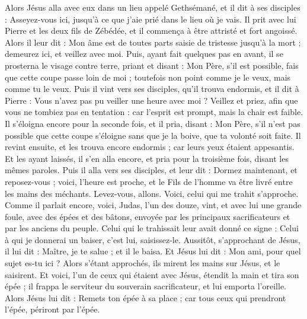 \begin{multicols}{2}
Alors Jésus alla avec eux dans un lieu appelé Gethsémané, et il dit à ses disciples : Asseyez-vous ici, jusqu'à ce que j’aie prié dans le lieu où je vais.
Il prit avec lui Pierre et les deux fils de Zébédée, et il commença à être attristé et fort angoissé.
Alors il leur dit : Mon âme est de toutes parts saisie de tristesse jusqu'à la mort ; demeurez ici, et veillez avec moi.
Puis, ayant fait quelques pas en avant, il se prosterna le visage contre terre, priant et disant : Mon Père, s’il est possible, fais que cette coupe passe loin de moi ; toutefois non point comme je le veux, mais comme tu le veux.
Puis il vint vers ses disciples, qu’il trouva endormis, et il dit à Pierre : Vous n’avez pas pu veiller une heure avec moi ?
Veillez et priez, afin que vous ne tombiez pas en tentation : car l’esprit est prompt, mais la chair est faible.
Il s’éloigna encore pour la seconde fois, et il pria, disant : Mon Père, s'il n'est pas possible que cette coupe s’éloigne sans que je la boive, que ta volonté soit faite.
Il revint ensuite, et les trouva encore endormis ; car leurs yeux étaient appesantis.
Et les ayant laissés, il s'en alla encore, et pria pour la troisième fois, disant les mêmes paroles.
Puis il alla vers ses disciples, et leur dit : Dormez maintenant, et reposez-vous ; voici, l'heure est proche, et le Fils de l'homme va être livré entre les mains des méchants.
Levez-vous, allons. Voici, celui qui me trahit s'approche.
Comme il parlait encore, voici, Judas, l'un des douze, vint, et avec lui une grande foule, avec des épées et des bâtons, envoyée par les principaux sacrificateurs et par les anciens du peuple.
Celui qui le trahissait leur avait donné ce signe : Celui à qui je donnerai un baiser, c'est lui, saisissez-le.
Aussitôt, s'approchant de Jésus, il lui dit : Maître, je te salue ; et il le baisa.
Et Jésus lui dit : Mon ami, pour quel sujet es-tu ici ? Alors s’étant approchés, ils mirent les mains sur Jésus, et le saisirent.
Et voici, l'un de ceux qui étaient avec Jésus, étendit la main et tira son épée ; il frappa le serviteur du souverain sacrificateur, et lui emporta l'oreille.
Alors Jésus lui dit : Remets ton épée à sa place ; car tous ceux qui prendront l'épée, périront par l'épée.

\end{multicols}
